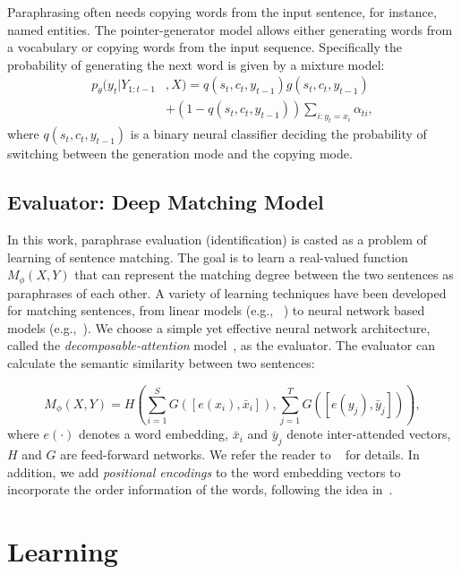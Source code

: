 \documentclass[11pt,a4paper]{article}
\newcommand{\MP}{M_{\phi}}
\begin{document}
    Paraphrasing often needs copying words from the input sentence, for instance, named entities. The pointer-generator model allows either generating words from a vocabulary or copying words from the input sequence. Specifically the probability of generating the next word is given by a mixture model:
    \[
        \begin{aligned}
            p_{\theta}(y_t|Y_{1:t-1}&, X) = q(s_t,c_t,y_{t-1}) g(s_t,c_t,y_{t-1}) \\
            &+(1-q(s_t,c_t,y_{t-1}))\sum\nolimits_{i:y_t=x_i}\alpha_{ti}, \label{eqn:copy}
        \end{aligned}
    \]
    where $q(s_t,c_t,y_{t-1})$ is a binary neural classifier deciding the probability of switching between the generation mode and the copying mode.

    \subsection{Evaluator: Deep Matching Model}\label{sec:matching}

    In this work, paraphrase evaluation (identification) is casted as a problem of learning of sentence matching. The goal is to learn a real-valued function $\MP(X, Y)$ that can represent the matching degree between the two sentences as paraphrases of each other. A variety of learning techniques have been developed for matching sentences, from linear models (e.g., ~\citet{wu2013learning}) to neural network based models (e.g.,~\citet{socher2011dynamic,hu2014convolutional}). We choose a simple yet effective neural network architecture, called the \textit{decomposable-attention} model~\citep{parikh2016decomposable}, as the evaluator. The evaluator can calculate the semantic similarity between two sentences:

    \vspace{-5pt}
    \small \[
        \MP(X, Y) = H(\sum_{i=1}^S G([e(x_i),\bar{x}_i]), \sum_{j=1}^T G([e(y_j), \bar{y}_j])),
    \]\normalsize
    where $e(\cdot)$ denotes a word embedding, $\bar{x}_i$ and $\bar{y}_j$ denote inter-attended vectors, $H$ and $G$ are feed-forward networks. We refer the reader to ~\citet{parikh2016decomposable} for details. In addition, we add \textit{positional encodings} to the word embedding vectors to incorporate the order information of the words, following the idea in~\citet{vaswani2017attention}.

\section{Learning}\label{sec:models}
\end{document}
